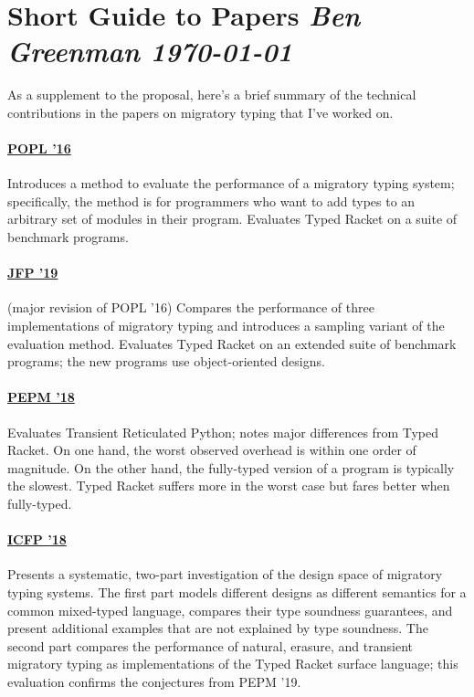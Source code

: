 \documentclass[10pt]{article}
\begin{document}

\nolinenumbers

\section*{Short Guide to Papers \hfill{\normalfont\small\it Ben Greenman \quad \today}}

As a supplement to the proposal, here's a brief summary of the
technical contributions in the papers on migratory typing that
I've worked on.


\bigskip
\hfill{}\decoone\hfill{}

\paragraph{\href{https://www2.ccs.neu.edu/racket/pubs/popl16-tfgnvf.pdf}{POPL '16}}
Introduces a method to evaluate the performance of a migratory typing system;
specifically, the method is for programmers who want to add types to an
arbitrary set of modules in their program.
Evaluates Typed Racket on a suite of benchmark programs.


\paragraph{\href{https://www2.ccs.neu.edu/racket/pubs/gtnffvf-jfp19.pdf}{JFP '19}}
(major revision of POPL '16) \quad
Compares the performance of three implementations of migratory typing and
introduces a sampling variant of the evaluation method.
Evaluates Typed Racket on an extended suite of benchmark programs; the new programs use
object-oriented designs.


\paragraph{\href{https://www2.ccs.neu.edu/racket/pubs/pepm18-gm.pdf}{PEPM '18}}
Evaluates Transient Reticulated Python; notes major differences from Typed
Racket.
On one hand, the worst observed overhead is within one order of
magnitude.
On the other hand, the fully-typed version of a program is
typically the slowest.
Typed Racket suffers more in the worst case but fares
better when fully-typed.


\paragraph{\href{https://www2.ccs.neu.edu/racket/pubs/icfp18-gf.pdf}{ICFP '18}}
Presents a systematic, two-part investigation of the design space of migratory
typing systems.
The first part models different designs as different semantics
for a common mixed-typed language, compares their type soundness guarantees,
and present additional examples that are not explained by type soundness. The
second part compares the performance of natural, erasure, and transient
migratory typing as implementations of the Typed Racket surface language; this
evaluation confirms the conjectures from PEPM '19.
\end{document}
